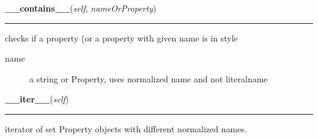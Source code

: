     \vspace{0.5ex}

\hspace{.8\funcindent}\begin{boxedminipage}{\funcwidth}

    \raggedright \textbf{\_\_contains\_\_}(\textit{self}, \textit{nameOrProperty})

    \vspace{-1.5ex}

    \rule{\textwidth}{0.5\fboxrule}
\setlength{\parskip}{2ex}

checks if a property (or a property with given name is in style
\begin{description}
\item[{name}] \leavevmode 
a string or Property, uses normalized name and not literalname

\end{description}
\setlength{\parskip}{1ex}
    \end{boxedminipage}

    \label{cssutils:css:cssstyledeclaration:CSSStyleDeclaration:__iter__}

    \vspace{0.5ex}

\hspace{.8\funcindent}\begin{boxedminipage}{\funcwidth}

    \raggedright \textbf{\_\_iter\_\_}(\textit{self})

    \vspace{-1.5ex}

    \rule{\textwidth}{0.5\fboxrule}
\setlength{\parskip}{2ex}

iterator of set Property objects with different normalized names.
\setlength{\parskip}{1ex}
    \end{boxedminipage}

    \vspace{0.5ex}

